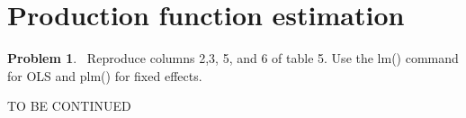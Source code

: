 \documentclass[11pt,reqno,letter]{article}
\theoremstyle{definition}
\theoremstyle{problem}
\newtheorem{prob}{Problem}
\newenvironment{problem} 
  {\begin{mdframed}\begin{prob}$\,$}
  {\end{prob}\end{mdframed}}
\begin{document}
\section{Production function estimation}

\begin{problem}
  Reproduce columns 2,3, 5, and 6 of table 5. Use the lm() command for
  OLS and plm() for fixed effects. 
\end{problem}

TO BE CONTINUED




\end{document}
